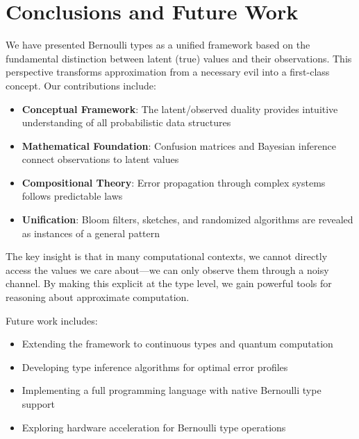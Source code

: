 \documentclass[11pt,final,hidelinks]{article}
\begin{document}
\section{Conclusions and Future Work}

We have presented Bernoulli types as a unified framework based on the fundamental distinction between latent (true) values and their observations. This perspective transforms approximation from a necessary evil into a first-class concept. Our contributions include:

\begin{itemize}
    \item \textbf{Conceptual Framework}: The latent/observed duality provides intuitive understanding of all probabilistic data structures
    \item \textbf{Mathematical Foundation}: Confusion matrices and Bayesian inference connect observations to latent values
    \item \textbf{Compositional Theory}: Error propagation through complex systems follows predictable laws
    \item \textbf{Unification}: Bloom filters, sketches, and randomized algorithms are revealed as instances of a general pattern
\end{itemize}

The key insight is that in many computational contexts, we cannot directly access the values we care about—we can only observe them through a noisy channel. By making this explicit at the type level, we gain powerful tools for reasoning about approximate computation.

Future work includes:
\begin{itemize}
    \item Extending the framework to continuous types and quantum computation
    \item Developing type inference algorithms for optimal error profiles
    \item Implementing a full programming language with native Bernoulli type support
    \item Exploring hardware acceleration for Bernoulli type operations
\end{itemize}


\end{document}
